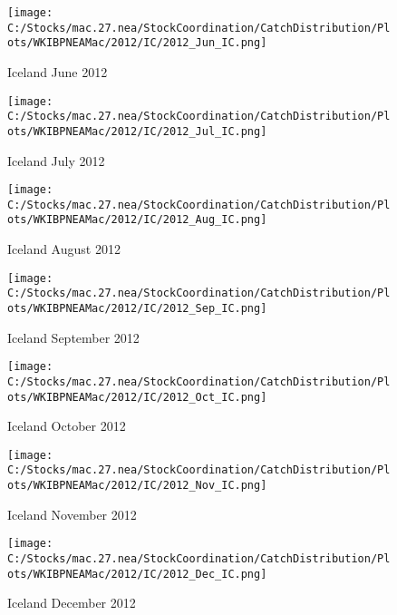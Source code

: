 \documentclass{article}
\begin{document}
\begin{figure}
	\centering
		\texttt{[image: C:/Stocks/mac.27.nea/StockCoordination/CatchDistribution/Plots/WKIBPNEAMac/2012/IC/2012\_Jun\_IC.png]}
	\caption{Iceland June 2012}
	\label{fig:2012_Jun_IC}
\end{figure}

\begin{figure}
	\centering
		\texttt{[image: C:/Stocks/mac.27.nea/StockCoordination/CatchDistribution/Plots/WKIBPNEAMac/2012/IC/2012\_Jul\_IC.png]}
	\caption{Iceland July 2012}
	\label{fig:2012_Jul_IC}
\end{figure}

\begin{figure}
	\centering
		\texttt{[image: C:/Stocks/mac.27.nea/StockCoordination/CatchDistribution/Plots/WKIBPNEAMac/2012/IC/2012\_Aug\_IC.png]}
	\caption{Iceland August 2012}
	\label{fig:2012_Aug_IC}
\end{figure}

\begin{figure}
	\centering
		\texttt{[image: C:/Stocks/mac.27.nea/StockCoordination/CatchDistribution/Plots/WKIBPNEAMac/2012/IC/2012\_Sep\_IC.png]}
	\caption{Iceland September 2012}
	\label{fig:2012_Sep_IC}
\end{figure}

\begin{figure}
	\centering
		\texttt{[image: C:/Stocks/mac.27.nea/StockCoordination/CatchDistribution/Plots/WKIBPNEAMac/2012/IC/2012\_Oct\_IC.png]}
	\caption{Iceland October 2012}
	\label{fig:2012_Oct_IC}
\end{figure}

\begin{figure}
	\centering
		\texttt{[image: C:/Stocks/mac.27.nea/StockCoordination/CatchDistribution/Plots/WKIBPNEAMac/2012/IC/2012\_Nov\_IC.png]}
	\caption{Iceland November 2012}
	\label{fig:2012_Nov_IC}
\end{figure}

\begin{figure}
	\centering
		\texttt{[image: C:/Stocks/mac.27.nea/StockCoordination/CatchDistribution/Plots/WKIBPNEAMac/2012/IC/2012\_Dec\_IC.png]}
	\caption{Iceland December 2012}
	\label{fig:2012_Dec_IC}
\end{figure}

\clearpage

\newpage
\end{document}
